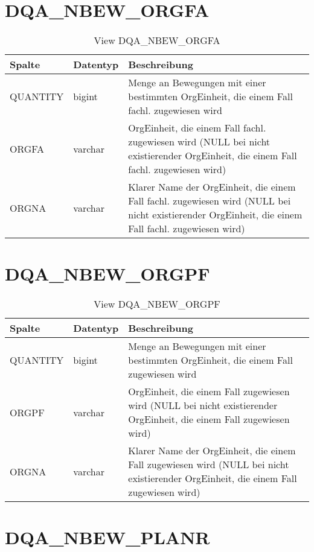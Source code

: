   \section{DQA\_NBEW\_ORGFA}

  \begin{table}[ht]
    \centering
    \caption{View DQA\_NBEW\_ORGFA}
    \label{tab:dqanbeworgfa}
    \begin{tabular}{||l|l|p{10cm}||}
      \hline
      Spalte & Datentyp & Beschreibung \\ [0.5ex] \hline \hline
QUANTITY & bigint & Menge an Bewegungen mit einer bestimmten OrgEinheit, die einem Fall fachl. zugewiesen wird \\ \hline
ORGFA & varchar & OrgEinheit, die einem Fall fachl. zugewiesen wird (NULL bei nicht existierender OrgEinheit, die einem Fall fachl. zugewiesen wird)\\ \hline
ORGNA & varchar & Klarer Name der OrgEinheit, die einem Fall fachl. zugewiesen wird (NULL bei nicht existierender OrgEinheit, die einem Fall fachl. zugewiesen wird)\\ \hline
    \end{tabular}
  \end{table}
 \clearpage
  \section{DQA\_NBEW\_ORGPF}

  \begin{table}[ht]
    \centering
    \caption{View DQA\_NBEW\_ORGPF}
    \label{tab:dqanbeworgpf}
    \begin{tabular}{||l|l|p{10cm}||}
      \hline
      Spalte & Datentyp & Beschreibung \\ [0.5ex] \hline \hline
QUANTITY & bigint & Menge an Bewegungen mit einer bestimmten OrgEinheit, die einem Fall zugewiesen wird \\ \hline
ORGPF & varchar & OrgEinheit, die einem Fall zugewiesen wird (NULL bei nicht existierender OrgEinheit, die einem Fall zugewiesen wird)\\ \hline
ORGNA & varchar & Klarer Name der OrgEinheit, die einem Fall zugewiesen wird (NULL bei nicht existierender OrgEinheit, die einem Fall zugewiesen wird)\\ \hline
    \end{tabular}
  \end{table}
 
  \section{DQA\_NBEW\_PLANR}

